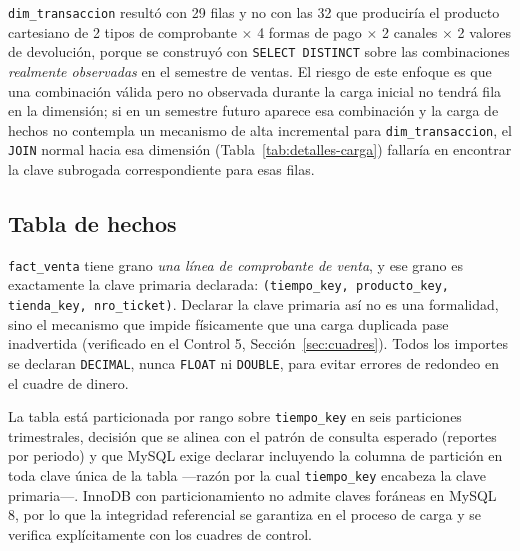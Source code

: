 \documentclass[11pt,a4paper]{article}
\begin{document}
\texttt{dim\_transaccion} resultó con 29 filas y no con las 32 que produciría el producto cartesiano de 2 tipos de comprobante $\times$ 4 formas de pago $\times$ 2 canales $\times$ 2 valores de devolución, porque se construyó con \texttt{SELECT DISTINCT} sobre las combinaciones \emph{realmente observadas} en el semestre de ventas. El riesgo de este enfoque es que una combinación válida pero no observada durante la carga inicial no tendrá fila en la dimensión; si en un semestre futuro aparece esa combinación y la carga de hechos no contempla un mecanismo de alta incremental para \texttt{dim\_transaccion}, el \texttt{JOIN} normal hacia esa dimensión (Tabla~\ref{tab:detalles-carga}) fallaría en encontrar la clave subrogada correspondiente para esas filas.

\subsection{Tabla de hechos}

\texttt{fact\_venta} tiene grano \emph{una línea de comprobante de venta}, y ese grano es exactamente la clave primaria declarada: \texttt{(tiempo\_key, producto\_key, tienda\_key, nro\_ticket)}. Declarar la clave primaria así no es una formalidad, sino el mecanismo que impide físicamente que una carga duplicada pase inadvertida (verificado en el Control 5, Sección~\ref{sec:cuadres}). Todos los importes se declaran \texttt{DECIMAL}, nunca \texttt{FLOAT} ni \texttt{DOUBLE}, para evitar errores de redondeo en el cuadre de dinero.

La tabla está particionada por rango sobre \texttt{tiempo\_key} en seis particiones trimestrales, decisión que se alinea con el patrón de consulta esperado (reportes por periodo) y que MySQL exige declarar incluyendo la columna de partición en toda clave única de la tabla —razón por la cual \texttt{tiempo\_key} encabeza la clave primaria—. InnoDB con particionamiento no admite claves foráneas en MySQL 8, por lo que la integridad referencial se garantiza en el proceso de carga y se verifica explícitamente con los cuadres de control.
\end{document}
